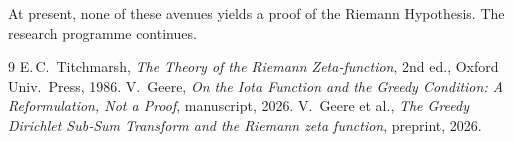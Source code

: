 \documentclass[11pt,a4paper]{article}
\begin{document}
At present, none of these avenues yields a proof of the Riemann Hypothesis.  The research programme continues.

\begin{thebibliography}{9}
 E.\,C.\ Titchmarsh, \textit{The Theory of the Riemann Zeta‑function}, 2nd ed., Oxford Univ.\ Press, 1986.
 V.\ Geere, \textit{On the Iota Function and the Greedy Condition: A Reformulation, Not a Proof}, manuscript, 2026.
 V.\ Geere et al., \textit{The Greedy Dirichlet Sub‑Sum Transform and the Riemann zeta function}, preprint, 2026.
\end{thebibliography}
\end{document}

